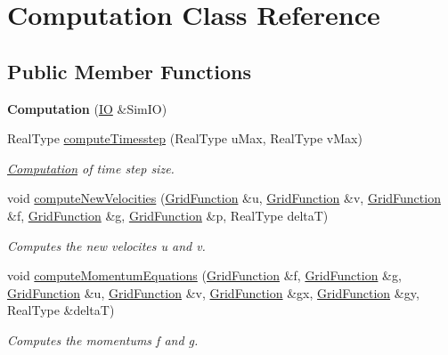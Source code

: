 \hypertarget{class_computation}{\section{Computation Class Reference}
\label{class_computation}
}
\subsection*{Public Member Functions}
\begin{DoxyCompactItemize}
\item 
\hypertarget{class_computation_afb63126d5f8b4eeae8ac39fa7be52b23}{{\bfseries Computation} (\hyperlink{class_i_o}{I\-O} \&Sim\-I\-O)}\label{class_computation_afb63126d5f8b4eeae8ac39fa7be52b23}

\item 
Real\-Type \hyperlink{class_computation_a5315aae8f2cc828435c20f89082438d0}{compute\-Timesstep} (Real\-Type u\-Max, Real\-Type v\-Max)
\begin{DoxyCompactList}\small\item\em \hyperlink{class_computation}{Computation} of time step size. \end{DoxyCompactList}\item 
void \hyperlink{class_computation_ae443fb8d9329df8460a3a2c898cc7a61}{compute\-New\-Velocities} (\hyperlink{class_grid_function}{Grid\-Function} \&u, \hyperlink{class_grid_function}{Grid\-Function} \&v, \hyperlink{class_grid_function}{Grid\-Function} \&f, \hyperlink{class_grid_function}{Grid\-Function} \&g, \hyperlink{class_grid_function}{Grid\-Function} \&p, Real\-Type delta\-T)
\begin{DoxyCompactList}\small\item\em Computes the new velocites u and v. \end{DoxyCompactList}\item 
void \hyperlink{class_computation_a89bb9373807439f68bafc74e67a4d38c}{compute\-Momentum\-Equations} (\hyperlink{class_grid_function}{Grid\-Function} \&f, \hyperlink{class_grid_function}{Grid\-Function} \&g, \hyperlink{class_grid_function}{Grid\-Function} \&u, \hyperlink{class_grid_function}{Grid\-Function} \&v, \hyperlink{class_grid_function}{Grid\-Function} \&gx, \hyperlink{class_grid_function}{Grid\-Function} \&gy, Real\-Type \&delta\-T)
\begin{DoxyCompactList}\small\item\em Computes the momentums f and g. \end{DoxyCompactList}\item 

\end{DoxyCompactItemize}
